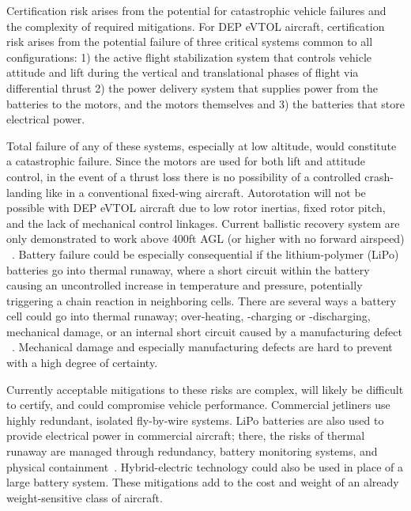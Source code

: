 \documentclass[]{aiaa-tc}%
\begin{document}

Certification risk arises from the potential for catastrophic vehicle failures and the complexity of required mitigations.  For DEP eVTOL aircraft, certification risk arises from the potential failure of three critical systems common to all configurations:  1) the active flight stabilization system that controls vehicle attitude and lift during the vertical and translational phases of flight via differential thrust 2) the power delivery system that supplies power from the batteries to the motors, and the motors themselves and 3) the batteries that store electrical power. 

Total failure of any of these systems, especially at low altitude, would constitute a catastrophic failure.  Since the motors are used for both lift and attitude control, in the event of a thrust loss there is no possibility of a controlled crash-landing like in a conventional fixed-wing aircraft. Autorotation will not be possible with DEP eVTOL aircraft due to low rotor inertias, fixed rotor pitch, and the lack of mechanical control linkages. Current ballistic recovery system are only demonstrated to work above 400ft AGL (or higher with no forward airspeed) ~\cite{CAPS}.  Battery failure could be especially consequential if the lithium-polymer (LiPo) batteries go into thermal runaway, where a short circuit within the battery causing an uncontrolled increase in temperature and pressure, potentially triggering a chain reaction in neighboring cells.  There are several ways a battery cell could go into thermal runaway; over-heating, -charging or -discharging, mechanical damage, or an internal short circuit caused by a manufacturing defect ~\cite{Doughty2012}.  Mechanical damage and especially manufacturing defects are hard to prevent with a high degree of certainty.

Currently acceptable mitigations to these risks are complex, will likely be difficult to certify, and could compromise vehicle performance. Commercial jetliners use highly redundant, isolated fly-by-wire systems.  LiPo batteries are also used to provide electrical power in commercial aircraft; there, the risks of thermal runaway are managed through redundancy, battery monitoring systems, and physical containment~\cite{}. Hybrid-electric technology could also be used in place of a large battery system.  These mitigations add to the cost and weight of an already weight-sensitive class of aircraft.  
\end{document}
